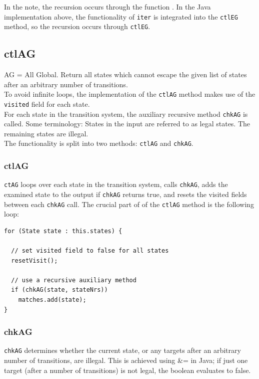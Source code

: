 In the note, the recursion occurs through the function . In the Java implementation above, the functionality of \texttt{iter} is integrated into the \texttt{ctlEG} method, so the recursion occurs through \texttt{ctlEG}.

\subsection{ctlAG}
AG = All Global. Return all states which cannot escape the given list of states after an arbitrary number of transitions.\\

To avoid infinite loops, the implementation of the \texttt{ctlAG} method makes use of the \texttt{visited} field for each state.\\

For each state in the transition system, the auxiliary recursive method \texttt{chkAG} is called. 
Some terminology: States in the input are referred to as legal states. The remaining states are illegal. \\

The functionality is split into two methods:  \texttt{ctlAG} and \texttt{chkAG}.

\subsubsection{ctlAG}
\texttt{ctAG} loops over each state in the transition system, calls \texttt{chkAG}, adds the examined state to the output if \texttt{chkAG} returns true, and resets the visited fields between each \texttt{chkAG} call. The crucial part of of the \texttt{ctlAG} method is the following loop:

\begin{lstlisting}
for (State state : this.states) {

  // set visited field to false for all states
  resetVisit();

  // use a recursive auxiliary method
  if (chkAG(state, stateNrs))
    matches.add(state);
}
\end{lstlisting}

\subsubsection{chkAG}
\texttt{chkAG} determines whether the current state, or any targets after an arbitrary number of transitions, are illegal. This is achieved using \&= in Java; if just one target (after a number of transitions) is not legal, the boolean evaluates to false. \\

